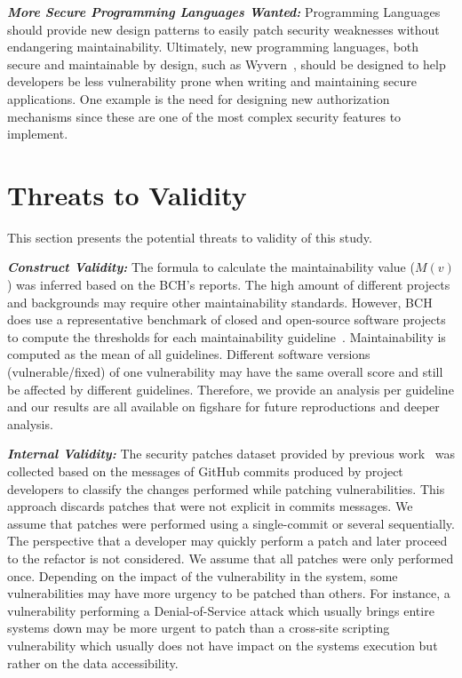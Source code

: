 \documentclass[smallextended]{svjour3}       %
\newcommand\Rui[1]{\nb{Rui}{blue}{#1}}
\begin{document}
\textit{\textbf{More Secure Programming Languages Wanted:}} Programming 
	Languages should provide new design patterns to easily patch security weaknesses 
	without endangering maintainability. Ultimately, new programming languages, 
	both secure and maintainable by design, such as Wyvern~\cite{10.1145/2489828.2489830,kurilova2014wyvern}, 
	should be designed to help developers be less vulnerability prone when 
	writing and maintaining secure applications. One example is the need for 
	designing new authorization mechanisms since these are one of the most 
	complex security features to implement.
% 

\section{Threats to Validity}\label{sec:threats}
%
This section presents the potential threats to validity of this study.
%

\textit{\textbf{Construct Validity:}} The formula to calculate the maintainability value ($M(v)$) was inferred based 
on the BCH's reports. The high amount of different projects and backgrounds 
may require other maintainability standards. However, BCH does use a 
representative benchmark of closed and open-source software projects to compute 
the thresholds for each maintainability guideline~\cite{Visser:2016:OREILLY,baggen2012}.
Maintainability is computed as the mean of all guidelines. Different software versions 
(vulnerable/fixed) of one vulnerability may have the same overall score
and still be affected by different guidelines. Therefore, we provide
an analysis per guideline and our results are all available on figshare for future reproductions and deeper analysis. 

\textit{\textbf{Internal Validity:}} The security patches dataset provided by previous
work~\cite{Reis:2017:IJSSE} was collected based on the messages of GitHub
commits produced by project developers to classify the changes performed while 
patching vulnerabilities. This approach discards patches that were
not explicit in commits messages. We assume that patches were performed 
using a single-commit or several sequentially. The 
perspective that a 
developer may quickly perform a patch and later 
proceed to the refactor is not considered. We assume 
that all patches were only performed once. Depending 
on the impact of the vulnerability in the system, some 
vulnerabilities may have more urgency to be patched than 
others. For instance, a vulnerability performing a Denial-of-Service attack
which usually brings entire systems down may be more urgent to patch than a 
cross-site scripting vulnerability which usually does not have impact
on the systems execution but rather on the data accessibility.
\end{document}
